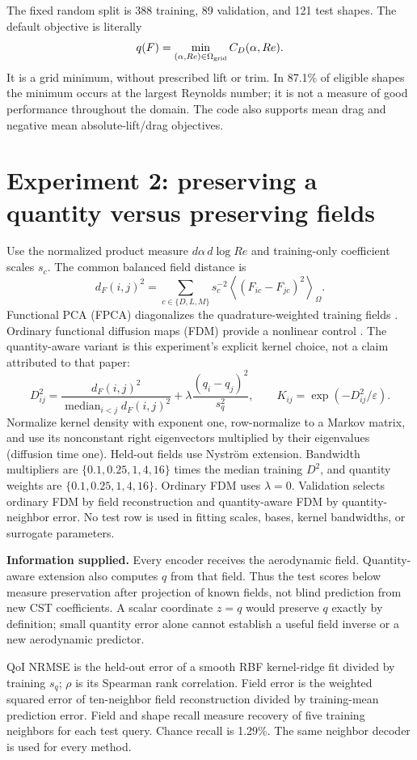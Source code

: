 \documentclass[10pt,a4paper]{article}
\begin{document}
The fixed random split is 388 training, 89 validation, and 121 test shapes.
The default objective is literally
\[
 q(F)=\min_{(\alpha,Re)\in\Omega_{\rm grid}} C_D(\alpha,Re).
\]
It is a grid minimum, without prescribed lift or trim. In 87.1\% of eligible
shapes the minimum occurs at the largest Reynolds number; it is not a measure
of good performance throughout the domain. The code also supports mean drag
and negative mean absolute-lift/drag objectives.

\newpage
\section{Experiment 2: preserving a quantity versus preserving fields}
Use the normalized product measure $d\alpha\,d\log Re$ and training-only
coefficient scales $s_c$. The common balanced field distance is
\[
 d_F(i,j)^2=\sum_{c\in\{D,L,M\}}s_c^{-2}
 \left\langle(F_{ic}-F_{jc})^2\right\rangle_\Omega.
\]
Functional PCA (FPCA) diagonalizes the quadrature-weighted training fields
\cite{happ2016}. Ordinary functional diffusion maps (FDM) provide a nonlinear
control \cite{barroso2024}. The quantity-aware variant is this experiment's
explicit kernel choice, not a claim attributed to that paper:
\[
 D_{ij}^2=\frac{d_F(i,j)^2}{\operatorname{median}_{i<j}d_F(i,j)^2}
       +\lambda\frac{(q_i-q_j)^2}{s_q^2},\qquad
 K_{ij}=\exp(-D_{ij}^2/\varepsilon).
\]
Normalize kernel density with exponent one, row-normalize to a Markov
matrix, and use its nonconstant right eigenvectors multiplied by their
eigenvalues (diffusion time one). Held-out fields use Nystr\"om extension.
Bandwidth multipliers are $\{0.1,0.25,1,4,16\}$ times the median training
$D^2$, and quantity weights are $\{0.1,0.25,1,4,16\}$. Ordinary FDM uses
$\lambda=0$. Validation selects ordinary FDM by field reconstruction and
quantity-aware FDM by quantity-neighbor error. No test row is used in fitting
scales, bases, kernel bandwidths, or surrogate parameters.

\textbf{Information supplied.} Every encoder receives the aerodynamic field.
Quantity-aware extension also computes $q$ from that field. Thus the test
scores below measure preservation after projection of known fields, not blind
prediction from new CST coefficients. A scalar coordinate $z=q$ would preserve
$q$ exactly by definition; small quantity error alone cannot establish a useful
field inverse or a new aerodynamic predictor.

\begin{center}\small

\end{center}
QoI NRMSE is the held-out error of a smooth RBF kernel-ridge fit divided by
training $s_q$; $\rho$ is its Spearman rank correlation. Field error is the
weighted squared error of ten-neighbor field reconstruction divided by
training-mean prediction error. Field and shape recall measure recovery of
five training neighbors for each test query. Chance recall is 1.29\%.
The same neighbor decoder is used for every method.
\end{document}
